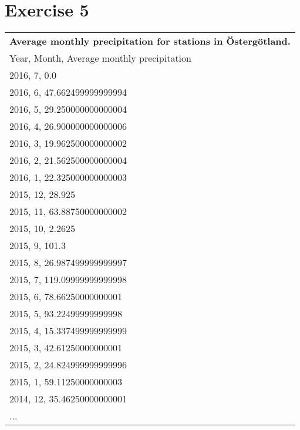 \documentclass[a4paper,titlepage,12pt]{article}
\begin{document}
\section{Exercise 5}
\begin{tabular}{l}
  \bf Average monthly precipitation for stations in Östergötland. \\ 
  Year, Month, Average monthly precipitation \\
  \hline
  2016,    7,                0.0 \\ 
  2016,    6, 47.662499999999994 \\ 
  2016,    5, 29.250000000000004 \\
  2016,    4, 26.900000000000006 \\
  2016,    3, 19.962500000000002 \\
  2016,    2, 21.562500000000004 \\
  2016,    1, 22.325000000000003 \\
  2015,   12,             28.925 \\
  2015,   11,  63.88750000000002 \\
  2015,   10,             2.2625 \\
  2015,    9,              101.3 \\
  2015,    8, 26.987499999999997 \\
  2015,    7, 119.09999999999998 \\
  2015,    6,  78.66250000000001 \\
  2015,    5,  93.22499999999998 \\
  2015,    4, 15.337499999999999 \\
  2015,    3,  42.61250000000001 \\
  2015,    2, 24.824999999999996 \\
  2015,    1,  59.11250000000003 \\
  2014,   12,  35.46250000000001 \\
  ... \\
\end{tabular}
\end{document}
